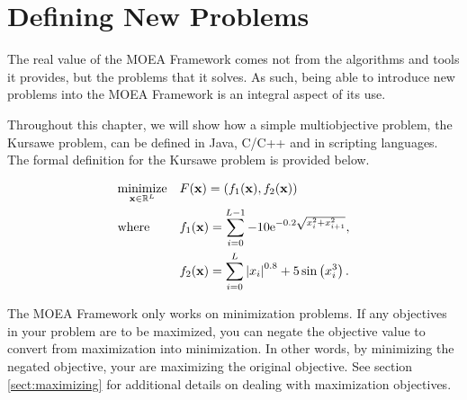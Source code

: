 %
%

\chapter{Defining New Problems}

The real value of the MOEA Framework comes not from the algorithms and tools it provides, but the problems that it solves.  As such, being able to introduce new problems into the MOEA Framework is an integral aspect of its use.

Throughout this chapter, we will show how a simple multiobjective problem, the Kursawe problem, can be defined in Java, C/C++ and in scripting languages.  The formal definition for the Kursawe problem is provided below.

\begin{equation}
  \label{eq:mop}
  \begin{aligned}
    & \underset{\mathbf{x} \in \mathbb{R}^L}{\text{minimize}}
      & & F(\mathbf{x}) = (f_1(\mathbf{x}), f_2(\mathbf{x})) \\
    & \text{where}
      & & f_1(\mathbf{x}) = \sum_{i=0}^{L-1} -10\text{e}^{-0.2\sqrt{x_i^2 + x_{i+1}^2}}, \\
    & & & f_2(\mathbf{x}) = \sum_{i=0}^{L} \left|x_i\right|^{0.8} + 5\sin\left(x_i^3\right).
  \end{aligned}
\end{equation}

\begin{important}
The MOEA Framework only works on minimization problems.  If any objectives in your problem are to be maximized, you can negate the objective value to convert from maximization into minimization.  In other words, by minimizing the negated objective, your are maximizing the original objective.  See section \ref{sect:maximizing} for additional details on dealing with maximization objectives.
\end{important}

